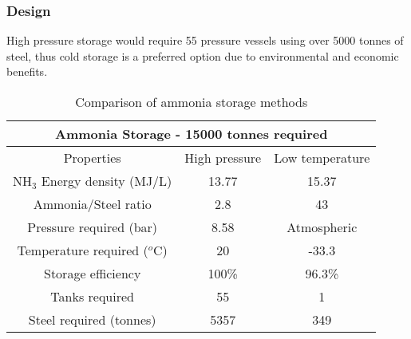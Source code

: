 \subsubsection{Design}
High pressure storage would require 55 pressure vessels using over 5000 tonnes of steel, thus cold storage is a preferred option due to environmental and economic benefits. 

\begin{table}[!htbp]
	\begin{center}
		\caption{Comparison of ammonia storage methods}
		\begin{tabular}{ |c||c||c|| }
			\hline
			\multicolumn{3}{|c|}{Ammonia Storage - 15000 tonnes required } \\
			\hline
			
			Properties & High pressure& Low temperature\\
			\hline
			NH$_3$ Energy density (MJ/L) & 13.77& 15.37\\
			Ammonia/Steel ratio & 2.8& 43\\
			Pressure required (bar) & 8.58 &Atmospheric\\
			Temperature required ($^o$C)& 20 &-33.3\\
			Storage efficiency&100\%&96.3\% \\
			
			Tanks required   &55&1 \\
			Steel required (tonnes)   &5357&349 \\
			
			
			\hline
		\end{tabular}
		\\
	
		
	\end{center}
	
\end{table}


